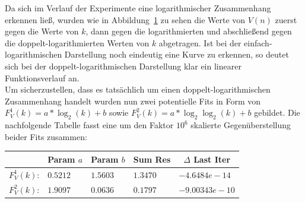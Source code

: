 \begin{figure}[H]
\begin{minipage}[t]{.30\textwidth}
    \end{minipage}
    \vspace*{-.1cm}
    \label{fig: min_V_k}
\end{figure}

\noindent
Da sich im Verlauf der Experimente eine logarithmischer Zusammenhang erkennen ließ, wurden wie in Abbildung~\ref{fig: min_V_k} zu sehen die Werte von $V(n)$ zuerst gegen die Werte von $k$, dann gegen die logarithmierten und abschließend gegen die doppelt-logarithmierten Werten von $k$ abgetragen. Ist bei der einfach-logarithmischen Darstellung noch eindeutig eine Kurve zu erkennen, so deutet sich bei der doppelt-logarithmischen Darstellung klar ein linearer Funktionsverlauf an.\\[.1cm]
Um sicherzustellen, dass es tatsächlich um einen doppelt-logarithmischen Zusammenhang handelt wurden nun zwei potentielle Fits in Form von $F_V^1(k)= a * \log_2(k) + b$ sowie $F_V^2(k)=a * \log_2\log_2(k) + b$ gebildet. Die nachfolgende Tabelle fasst eine um den Faktor $10^6$ skalierte Gegenüberstellung beider Fits zusammen:

\begin{center}
\begin{tabular}{c||l|l|l|l}

&\multicolumn{1}{c|}{Param $a$}&
\multicolumn{1}{c|}{Param $b$}&
\multicolumn{1}{c|}{Sum Res}&
\multicolumn{1}{c}{$\Delta$ Last Iter}\\
\hline
$F_V^1(k)$:&$0.5212$&$1.5603$&$1.3470$&$-4.6484e-14$\\
\hline
$F_V^2(k)$:&$1.9097$&$0.0636$&$0.1797$&$-9.00343e-10$

\end{tabular}
\end{center}

